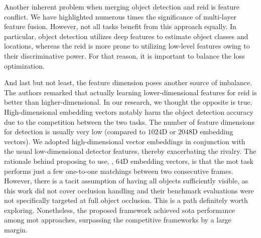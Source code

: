 Another inherent problem when merging object detection and \gls{reid} is feature conflict. We have highlighted numerous times the significance of multi-layer feature fusion. However, not all tasks benefit from this approach equally. In particular, object detection utilizes deep features to estimate object classes and locations, whereas the \gls{reid} is more prone to utilizing low-level features owing to their discriminative power. For that reason, it is important to balance the loss optimization.

And last but not least, the feature dimension poses another source of imbalance. The authors remarked that actually learning lower-dimensional features for \gls{reid} is better than higher-dimensional. In our research, we thought the opposite is true. High-dimensional embedding vectors notably harm the object detection accuracy due to the competition between the two tasks. The number of feature dimensions for detection is usually very low (compared to $1024$D or $2048$D embedding vectors). We adopted high-dimensional vector embeddings in conjunction with the usual low-dimensional detector features, thereby exacerbating the rivalry. The rationale behind proposing to use, \egtext{}, $64$D embedding vectors, is that the \gls{mot} task performs just a few one-to-one matchings between two consecutive frames. However, there is a tacit assumption of having all objects sufficiently visible, as this work did not cover occlusion handling and their benchmark evaluations were not specifically targeted at full object occlusion. This is a path definitely worth exploring. Nonetheless, the proposed framework achieved \gls{sota} performance among \gls{mot} approaches, surpassing the competitive frameworks by a large margin.
